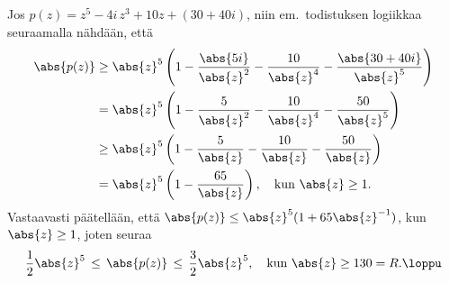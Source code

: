 \begin{Exa} Jos $p(z) = z^5 -4i\,z^3 + 10z + (30+40i)$, niin em.\ todistuksen logiikkaa 
seuraamalla nähdään, että
\begin{align*}
\abs{p(z)} &\ge \abs{z}^5
                \left(1 - \frac{\abs{5i}}{\abs{z}^2} - \frac{10}{\abs{z}^4} 
                                                     - \frac{\abs{30+40i}}{\abs{z}^5}\right) \\
           &=   \abs{z}^5\left(1 - \frac{5}{\abs{z}^2} - \frac{10}{\abs{z}^4} 
                                                       - \frac{50}{\abs{z}^5}\right) \\
           &\ge \abs{z}^5\left(1 - \frac{5}{\abs{z}} - \frac{10}{\abs{z}} 
                                                     - \frac{50}{\abs{z}}\right) \\
           &=   \abs{z}^5\left(1 - \frac{65}{\abs{z}}\right), \quad \text{kun}\ \abs{z} \ge 1.
\end{align*}
Vastaavasti päätellään, että $\abs{p(z)}\le\abs{z}^5(1+65\abs{z}^{-1})$, kun $\abs{z} \ge 1$,
joten seuraa
\[
\frac{1}{2}\abs{z}^5\,\le\,\abs{p(z)}\,\le\,\frac{3}{2}\abs{z}^5, \quad 
                                            \text{kun}\ \abs{z} \ge 130 = R. \loppu
\]
\end{Exa}

